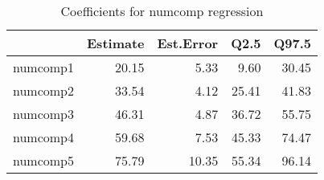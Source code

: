 \begin{table}[ht]
\centering
\begin{tabular}{rrrrr}
  \hline
 & Estimate & Est.Error & Q2.5 & Q97.5 \\ 
  \hline
numcomp1 & 20.15 & 5.33 & 9.60 & 30.45 \\ 
  numcomp2 & 33.54 & 4.12 & 25.41 & 41.83 \\ 
  numcomp3 & 46.31 & 4.87 & 36.72 & 55.75 \\ 
  numcomp4 & 59.68 & 7.53 & 45.33 & 74.47 \\ 
  numcomp5 & 75.79 & 10.35 & 55.34 & 96.14 \\ 
   \hline
\end{tabular}
\caption{Coefficients for numcomp regression} 
\end{table}
